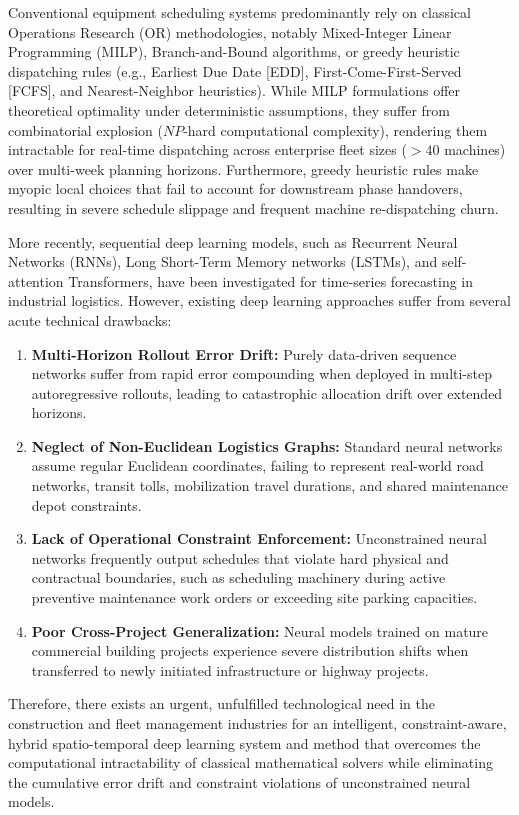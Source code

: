 \documentclass[11pt,a4paper]{article}
\begin{document}
\noindent Conventional equipment scheduling systems predominantly rely on classical Operations Research (OR) methodologies, notably Mixed-Integer Linear Programming (MILP), Branch-and-Bound algorithms, or greedy heuristic dispatching rules (e.g., Earliest Due Date [EDD], First-Come-First-Served [FCFS], and Nearest-Neighbor heuristics). While MILP formulations offer theoretical optimality under deterministic assumptions, they suffer from combinatorial explosion ($NP$-hard computational complexity), rendering them intractable for real-time dispatching across enterprise fleet sizes ($>40$ machines) over multi-week planning horizons. Furthermore, greedy heuristic rules make myopic local choices that fail to account for downstream phase handovers, resulting in severe schedule slippage and frequent machine re-dispatching churn.

\noindent More recently, sequential deep learning models, such as Recurrent Neural Networks (RNNs), Long Short-Term Memory networks (LSTMs), and self-attention Transformers, have been investigated for time-series forecasting in industrial logistics. However, existing deep learning approaches suffer from several acute technical drawbacks:
\begin{enumerate}
    \item \textbf{Multi-Horizon Rollout Error Drift:} Purely data-driven sequence networks suffer from rapid error compounding when deployed in multi-step autoregressive rollouts, leading to catastrophic allocation drift over extended horizons.
    \item \textbf{Neglect of Non-Euclidean Logistics Graphs:} Standard neural networks assume regular Euclidean coordinates, failing to represent real-world road networks, transit tolls, mobilization travel durations, and shared maintenance depot constraints.
    \item \textbf{Lack of Operational Constraint Enforcement:} Unconstrained neural networks frequently output schedules that violate hard physical and contractual boundaries, such as scheduling machinery during active preventive maintenance work orders or exceeding site parking capacities.
    \item \textbf{Poor Cross-Project Generalization:} Neural models trained on mature commercial building projects experience severe distribution shifts when transferred to newly initiated infrastructure or highway projects.
\end{enumerate}

\noindent Therefore, there exists an urgent, unfulfilled technological need in the construction and fleet management industries for an intelligent, constraint-aware, hybrid spatio-temporal deep learning system and method that overcomes the computational intractability of classical mathematical solvers while eliminating the cumulative error drift and constraint violations of unconstrained neural models.
\end{document}
